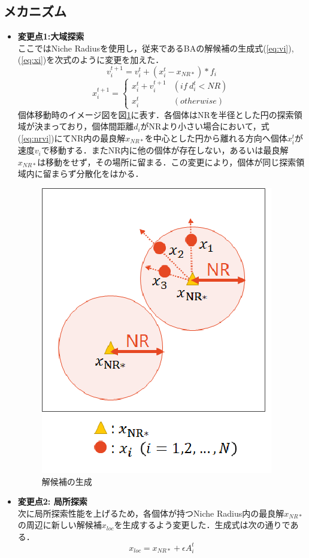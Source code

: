 \documentclass[a4j,11pt]{jarticle}
\begin{document}
\subsection{メカニズム}
\label{ss:NRBA-abst}
\begin{itemize}
\item {\bf 変更点1:大域探索} \\
ここではNiche Radiusを使用し，従来であるBAの解候補の生成式(\ref{eq:vi}),(\ref{eq:xi})を次式のように変更を加えた．
\begin{equation}
\label{eq:nrvi}
v_i^{t+1}=v_i^t+(x_i^t-x_{NR*})*f_i
\end{equation}
\begin{equation}
\label{eq:nrxi}
x_i^{t+1}= \begin{cases}
x_i^t+v_i^{t+1} & (if \ d_i^t < NR) \\
x_i^t & (otherwise)
\end{cases}
\end{equation}
個体移動時のイメージ図を図\ref{fig:nr}に表す．各個体はNRを半径とした円の探索領域が決まっており，個体間距離${d_i}$がNRより小さい場合において，式(\ref{eq:nrvi})にてNR内の最良解${x_{NR*}}$を中心とした円から離れる方向へ個体${x_i^t}$が速度${v_i}$で移動する．またNR内に他の個体が存在しない，あるいは最良解$x_{NR*}$は移動をせず，その場所に留まる．この変更により，個体が同じ探索領域内に留まらず分散化をはかる．
\begin{figure}[h]
  \centering
  \includegraphics[width=0.5\linewidth]{eps/SICESSI2018/niche_radius.eps}
  \caption{解候補の生成}
  \label{fig:nr}
\end{figure}

\item {\bf 変更点2: 局所探索} \\
次に局所探索性能を上げるため，各個体が持つNiche Radius内の最良解${x_{NR*}}$の周辺に新しい解候補${x_{loc}}$を生成するよう変更した．生成式は次の通りである．
\begin{equation}
\label{eq:nrloc}
x_{loc}=x_{NR*} + \epsilon A_i^t
\end{equation}


\end{itemize}
\end{document}
